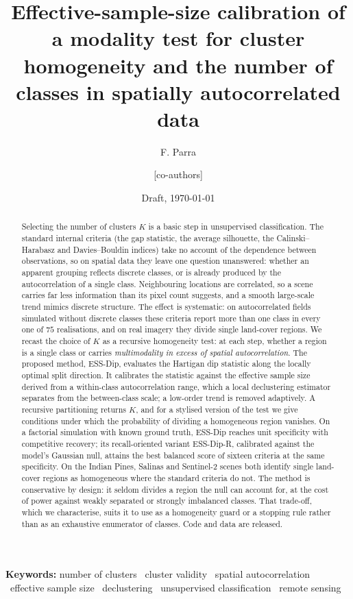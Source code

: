 \documentclass[11pt]{article}
\title{Effective-sample-size calibration of a modality test for cluster
homogeneity and the number of classes in spatially autocorrelated data}
\author{F. Parra \and [co-authors]}
\date{Draft, \today}
\theoremstyle{plain}
\theoremstyle{definition}
\theoremstyle{remark}
\begin{document}
\maketitle

\begin{abstract}
Selecting the number of clusters $K$ is a basic step in unsupervised
classification. The standard internal criteria (the gap statistic, the
average silhouette, the Calinski--Harabasz and Davies--Bouldin indices)
take no account of the dependence between observations, so on spatial
data they leave one question unanswered: whether an apparent grouping reflects
discrete classes, or is already produced by the autocorrelation of a single
class. Neighbouring locations are correlated, so a scene carries far less
information than its pixel count suggests, and a smooth large-scale trend
mimics discrete structure. The effect is systematic: on autocorrelated fields
simulated without discrete classes these criteria report more than one class in
every one of $75$ realisations, and on real imagery they divide single
land-cover regions. We recast the choice of $K$ as a recursive homogeneity test: at each step,
whether a region is a single class or carries \emph{multimodality in excess of
spatial autocorrelation}. The proposed method, ESS-Dip, evaluates the Hartigan dip
statistic along the locally optimal split direction. It calibrates the statistic
against the effective sample size derived from a within-class autocorrelation
range, which a local declustering estimator separates from the between-class
scale; a low-order trend is removed adaptively. A recursive partitioning returns $K$,
and for a stylised version of the test we give conditions under which
the probability of dividing a homogeneous region vanishes. On a factorial
simulation with known ground truth, ESS-Dip reaches unit specificity with
competitive recovery; its recall-oriented variant ESS-Dip-R, calibrated against
the model's Gaussian null, attains the best balanced score of sixteen criteria
at the same specificity. On the Indian Pines, Salinas and Sentinel-2 scenes both
identify single land-cover regions as homogeneous where the standard criteria
do not. The method is conservative by design: it seldom divides a region the
null can account for, at the cost of power against weakly separated or strongly
imbalanced classes. That trade-off, which we characterise, suits it to use as a
homogeneity guard or a stopping rule rather than as an exhaustive enumerator of
classes. Code and data are released.
\end{abstract}

\noindent\textbf{Keywords:} number of clusters \textperiodcentered\ cluster
validity \textperiodcentered\ spatial autocorrelation \textperiodcentered\
effective sample size \textperiodcentered\ declustering \textperiodcentered\
unsupervised classification \textperiodcentered\ remote sensing













\end{document}

